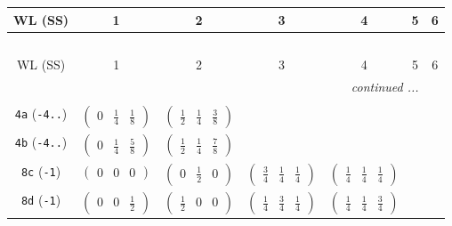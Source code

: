 \documentclass[fleqn,9pt,landscape]{jsarticle}
\begin{document}
\begin{center}
\renewcommand{\arraystretch}{1.2}
\begin{longtable}{ccccccc}
 \hline \hline
WL (SS) & 1 & 2 & 3 & 4 & 5 & 6 \\ \hline \endfirsthead

\multicolumn{6}{l}{\tablename\ \thetable{}} \\
 \hline \hline
WL (SS) & 1 & 2 & 3 & 4 & 5 & 6 \\ \hline \endhead

 \hline \hline
\multicolumn{6}{r}{\footnotesize\it continued ...} \\ \endfoot

 \hline \hline
\multicolumn{6}{r}{} \\ \endlastfoot

{\tt 4a} ({\tt -4..}) & $ \begin{pmatrix} 0 & \frac{1}{4} & \frac{1}{8} \end{pmatrix} $ & $ \begin{pmatrix} \frac{1}{2} & \frac{1}{4} & \frac{3}{8} \end{pmatrix} $ & $  $ & $  $ & $  $ & $  $ \\ \hline
{\tt 4b} ({\tt -4..}) & $ \begin{pmatrix} 0 & \frac{1}{4} & \frac{5}{8} \end{pmatrix} $ & $ \begin{pmatrix} \frac{1}{2} & \frac{1}{4} & \frac{7}{8} \end{pmatrix} $ & $  $ & $  $ & $  $ & $  $ \\ \hline
{\tt 8c} ({\tt -1}) & $ \begin{pmatrix} 0 & 0 & 0 \end{pmatrix} $ & $ \begin{pmatrix} 0 & \frac{1}{2} & 0 \end{pmatrix} $ & $ \begin{pmatrix} \frac{3}{4} & \frac{1}{4} & \frac{1}{4} \end{pmatrix} $ & $ \begin{pmatrix} \frac{1}{4} & \frac{1}{4} & \frac{1}{4} \end{pmatrix} $ & $  $ & $  $ \\ \hline
{\tt 8d} ({\tt -1}) & $ \begin{pmatrix} 0 & 0 & \frac{1}{2} \end{pmatrix} $ & $ \begin{pmatrix} \frac{1}{2} & 0 & 0 \end{pmatrix} $ & $ \begin{pmatrix} \frac{1}{4} & \frac{3}{4} & \frac{1}{4} \end{pmatrix} $ & $ \begin{pmatrix} \frac{1}{4} & \frac{1}{4} & \frac{3}{4} \end{pmatrix} $ & $  $ & $  $ \\ \hline

\end{longtable}
\end{center}
\end{document}
